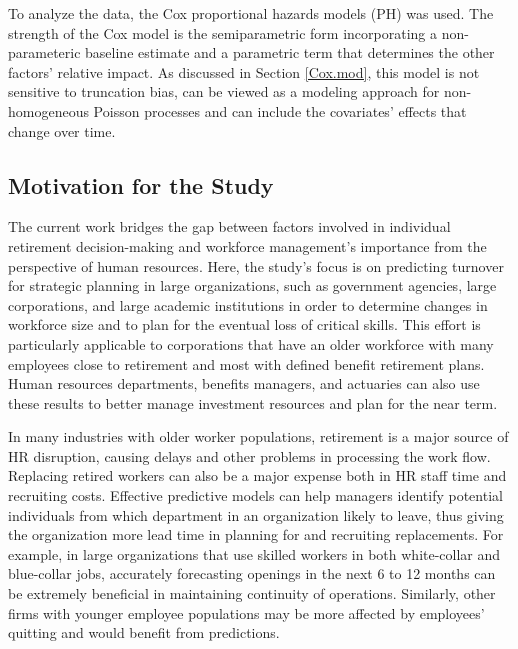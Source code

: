 To analyze the data, the Cox proportional hazards models (PH) was used.  The strength of the Cox model is the semiparametric form incorporating a non-parameteric baseline estimate and a parametric term that determines the other factors' relative impact. As discussed in Section \ref{Cox.mod}, this model is not sensitive to truncation bias, can be viewed as a modeling approach for non-homogeneous Poisson processes and can include the covariates' effects that change over time.

\subsection{Motivation for the Study}

The current work bridges the gap between factors involved in individual retirement decision-making and workforce management's importance from the perspective of human resources. Here, the study's focus is on predicting turnover for strategic planning in large organizations, such as government agencies, large corporations, and large academic institutions in order to determine changes in workforce size and to plan for the eventual loss of critical skills. This effort is particularly applicable to corporations that have an older workforce with many employees close to retirement and most  with defined benefit retirement plans. Human resources departments, benefits managers, and actuaries can also use these results to better manage investment resources and plan for the near term.

In many industries with older worker populations, retirement is a major source of HR disruption, causing delays and other problems in processing the work flow. Replacing retired workers can also be a major expense both in HR staff time and recruiting costs. Effective predictive models can help managers identify potential individuals from which department in an organization likely to leave, thus giving the organization more lead time in planning for and recruiting replacements. For example, in large organizations that use skilled workers  in both  white-collar  and  blue-collar  jobs, accurately forecasting openings in the next 6 to 12 months can be extremely beneficial in  maintaining continuity  of operations. Similarly, other firms with younger employee populations may be more affected by employees' quitting and would benefit from predictions. 

